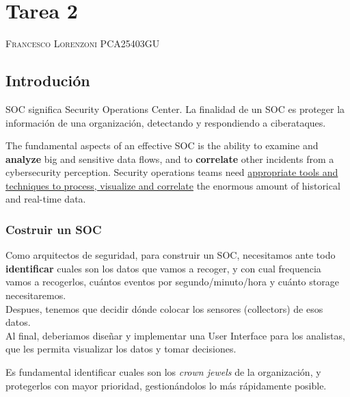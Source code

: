 \chapter*{Tarea 2}

\textsc{Francesco Lorenzoni PCA25403GU}


\section{Introdución}

SOC significa Security Operations Center. 
La finalidad de un SOC es proteger la información de una organización, detectando y respondiendo a ciberataques.

\begin{definition}
   The fundamental aspects of an effective SOC is the ability to examine and \textbf{analyze} big and sensitive data flows, and to \textbf{correlate}
other incidents from a cybersecurity perception. Security operations teams need \ul{appropriate tools and techniques to process,
visualize and correlate} the enormous amount of historical and real-time data.
\end{definition}

\subsection{Costruir un SOC}
Como arquitectos de seguridad, para construir un SOC, necesitamos ante todo {\textbf{identificar} cuales son los datos que vamos a recoger, y con cual frequencia vamos a recogerlos}, cuántos eventos por segundo/minuto/hora y cuánto storage necesitaremos.\\
Despues, tenemos que decidir dónde colocar los sensores (collectors) de esos datos.\\
Al final, deberiamos diseñar y implementar una User Interface para los analistas, que les permita visualizar los datos y tomar decisiones.

Es fundamental identificar {cuales son los \textit{crown jewels} de la organización}, y protegerlos con mayor prioridad, gestionándolos lo más rápidamente posible.



